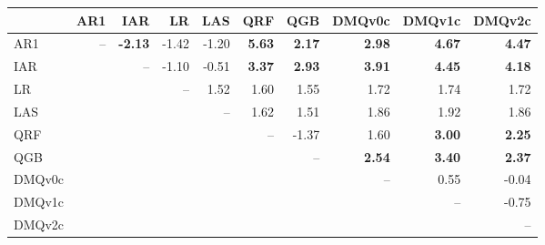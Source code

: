 \begin{tabular}{lrrrrrrrrr}
\toprule
 & AR1 & IAR & LR & LAS & QRF & QGB & DMQv0c & DMQv1c & DMQv2c \\
\midrule
AR1 & -- & \textbf{-2.13} & -1.42 & -1.20 & \textbf{5.63} & \textbf{2.17} & \textbf{2.98} & \textbf{4.67} & \textbf{4.47} \\
IAR &  & -- & -1.10 & -0.51 & \textbf{3.37} & \textbf{2.93} & \textbf{3.91} & \textbf{4.45} & \textbf{4.18} \\
LR &  &  & -- & 1.52 & 1.60 & 1.55 & 1.72 & 1.74 & 1.72 \\
LAS &  &  &  & -- & 1.62 & 1.51 & 1.86 & 1.92 & 1.86 \\
QRF &  &  &  &  & -- & -1.37 & 1.60 & \textbf{3.00} & \textbf{2.25} \\
QGB &  &  &  &  &  & -- & \textbf{2.54} & \textbf{3.40} & \textbf{2.37} \\
DMQv0c &  &  &  &  &  &  & -- & 0.55 & -0.04 \\
DMQv1c &  &  &  &  &  &  &  & -- & -0.75 \\
DMQv2c &  &  &  &  &  &  &  &  & -- \\
\bottomrule
\end{tabular}
